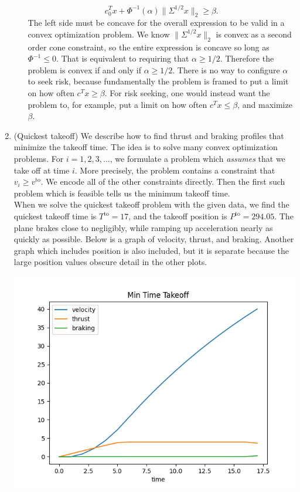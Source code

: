 \documentclass{article}
\begin{document}
\begin{enumerate}
\begin{enumerate}
\[        c_0^T x + \Phi^{-1}(\alpha) \| \Sigma^{1/2} x \|_2 \geq \beta.
    \] The left side must be concave for the overall expression to be valid in a convex optimization problem. We know $\| \Sigma^{1/2} x \|_2$ is convex as a second order cone constraint, so the entire expression is concave so long as $\Phi^{-1} \leq 0$. That is equivalent to requiring that $\alpha \geq 1/2$. Therefore the problem is convex if and only if $\alpha \geq 1/2$. There is no way to configure $\alpha$ to seek risk, because fundamentally the problem is framed to put a limit on how often $c^Tx \geq \beta$. For risk seeking, one would instead want the problem to, for example, put a limit on how often $c^Tx \leq \beta$, and maximize $\beta$.
    \end{enumerate}

\item (Quickest takeoff) We describe how to find thrust and braking profiles that minimize the takeoff time. The idea is to solve many convex optimization problems. For $i = 1, 2, 3, \dots$, we formulate a problem which \textit{assumes} that we take off at time $i$. More precisely, the problem contains a constraint that $v_i \geq v^\text{to}$. We encode all of the other constraints directly. Then the first such problem which is feasible tells us the minimum takeoff time. \\

    When we solve the quickest takeoff problem with the given data, we find the quickest takeoff time is $T^\text{to} = 17$, and the takeoff position is $P^\text{to} = 294.05$. The plane brakes close to negligibly, while ramping up acceleration nearly as quickly as possible. Below is a graph of velocity, thrust, and braking. Another graph which includes position is also included, but it is separate because the large position values obscure detail in the other plots.


    \begin{center}
    	\includegraphics[scale=0.5]{p2_plot_no_position}
    \end{center}
    

\end{enumerate}
\end{document}
